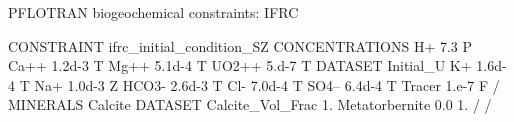 \documentclass{beamer}
\newcommand\bluecolor[1]{{{\color{blue} #1}}}
\begin{document}
\begin{frame}{PFLOTRAN biogeochemical constraints: IFRC}
\footnotesize
\begin{semiverbatim}
\bluecolor{CONSTRAINT} ifrc_initial_condition_SZ
  \bluecolor{CONCENTRATIONS}
    H+       7.3          \bluecolor{P}
    Ca++     1.2d-3       \bluecolor{T}
    Mg++     5.1d-4       \bluecolor{T}
    UO2++    5.d-7        \bluecolor{T DATASET} Initial_U
    K+       1.6d-4       \bluecolor{T}
    Na+      1.0d-3       \bluecolor{Z}
    HCO3-    2.6d-3       \bluecolor{T}
    Cl-      7.0d-4       \bluecolor{T}
    SO4--    6.4d-4       \bluecolor{T}
    Tracer   1.e-7        \bluecolor{F}    
  \bluecolor{/}
  \bluecolor{MINERALS}
    Calcite        \bluecolor{DATASET} Calcite_Vol_Frac 1.
    Metatorbernite 0.0   1.
  \bluecolor{/}
\bluecolor{/}
\end{semiverbatim}
\end{frame}
\end{document}
